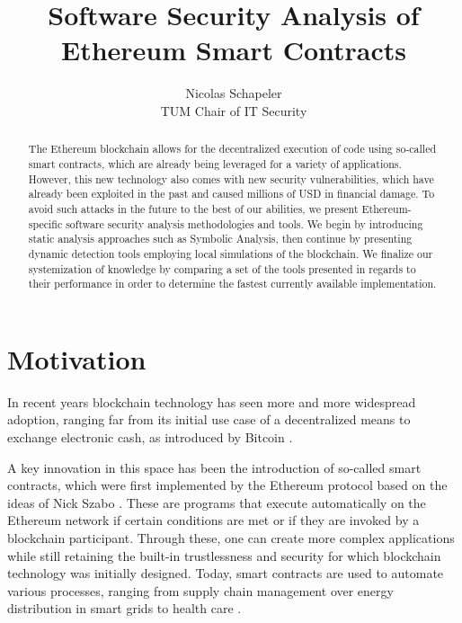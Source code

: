 \documentclass[letterpaper,twocolumn,10pt]{article}
\begin{document}

\date{}

\title{\Large \bf Software Security Analysis of Ethereum Smart Contracts}

\author{
{\rm Nicolas Schapeler}\\
TUM Chair of IT Security
} %

\maketitle

\begin{abstract}
The Ethereum blockchain allows for the decentralized execution of code using so-called smart contracts, which are already being leveraged for a variety of applications. However, this new technology also comes with new security vulnerabilities, which have already been exploited in the past and caused millions of USD in financial damage.
To avoid such attacks in the future to the best of our abilities, we present Ethereum-specific software security analysis methodologies and tools. We begin by introducing static analysis approaches such as Symbolic Analysis, then continue by presenting dynamic detection tools employing local simulations of the blockchain. We finalize our systemization of knowledge by comparing a set of the tools presented in regards to their performance in order to determine the fastest currently available implementation.


\end{abstract}


\section{Motivation}
In recent years blockchain technology has seen more and more widespread adoption, ranging far from its initial use case of a decentralized means to exchange electronic cash, as introduced by Bitcoin \cite{nakamoto}.

A key innovation in this space has been the introduction of so-called smart contracts, which were first implemented by the Ethereum protocol based on the ideas of Nick Szabo \cite{szabo_1996}. These are programs that execute automatically on the Ethereum network if certain conditions are met or if they are invoked by a blockchain participant. Through these, one can create more complex applications while still retaining the built-in trustlessness and security for which blockchain technology was initially designed. Today, smart contracts are used to automate various processes, ranging from supply chain management \cite{bhandari_2018} over energy distribution in smart grids \cite{giannakaris_trakadas_zahariadis_gkonis_papadopoulos_2019} to health care \cite{griggs_ossipova_kohlios_baccarini_howson_hayajneh_2018}.
\end{document}
